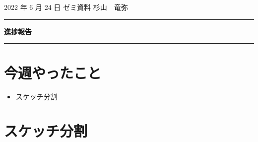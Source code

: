 \documentclass[onecolumn]{ujarticle}   %
\begin{document}

		\noindent
		\hspace{1em}
		2022 年 6 月 24 日
		ゼミ資料
		\hfill
		杉山　竜弥
		\vspace{2mm}

		\hrule
		\begin{center}
			{\Large \bf 進捗報告}
		\end{center}
		\hrule
		\vspace{9mm}


\section{今週やったこと}
\begin{itemize}
  \item スケッチ分割
\end{itemize}


\section{スケッチ分割}


\end{document}
